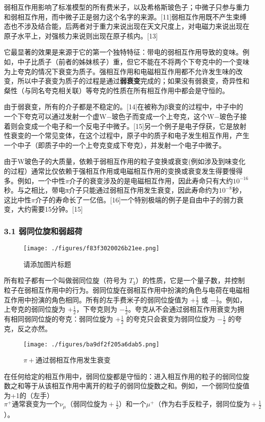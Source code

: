 弱相互作用影响了标准模型的所有费米子，以及希格斯玻色子；中微子只参与重力和弱相互作用，而中微子正是弱力这个名字的来源。[11]弱相互作用既不产生束缚态也不涉及结合能，后两者对于重力来说出现在天文尺度上，对电磁力来说出现在原子水平上，对强核力来说则出现在原子核内。[13]

它最显著的效果是来源于它的第一个独特特征：带电的弱相互作用导致的变味。例如，中子比质子（前者的姊妹核子）重，但它不能在不将两个下夸克中的一个变味为上夸克的情况下衰变为质子。强相互作用和电磁相互作用都不允许发生味的改变，所以中子衰变为质子的过程是通过\textbf{弱衰变}完成的；如果没有弱衰变，奇异性和粲性（与同名夸克相关联）等夸克的性质在所有相互作用中都会是守恒的。

由于弱衰变，所有的介子都是不稳定的。[14]在被称为β衰变的过程中，中子中的一个下夸克可以通过发射一个虚W−玻色子而变成一个上夸克，这个W−玻色子接着则会变成一个电子和一个反电子中微子。[15]另一个例子是电子俘获，它是放射性衰变的一个常见变体，在这个过程中，原子中的质子和电子发生相互作用，产生一个中子（即质子中的一个上夸克变成下夸克），并发射一个电子中微子。

由于W玻色子的大质量，依赖于弱相互作用的粒子变换或衰变(例如涉及到味变化的过程）通常比仅依赖于强相互作用或电磁相互作用的变换或衰变发生得要慢得多。例如，一个中性$\pi$介子的衰变涉及的是电磁相互作用，因此寿命只有大约$10^{-16}$秒。与之相比，带电π介子只能通过弱相互作用发生衰变，因此寿命约为$10^{-8}$秒，这比中性$\pi$介子的寿命长了一亿倍。[16]一个特别极端的例子是自由中子的弱力衰变，大约需要15分钟。[15]

\subsubsection{3.1 弱同位旋和弱超荷}
\begin{figure}[ht]
\centering
\texttt{[image: ./figures/f83f3020026b21ee.png]}
\caption{请添加图片标题} \label{fig_RXHZY_4}
\end{figure}

所有粒子都有一个叫做弱同位旋（符号为 $T_3$）的性质，它是一个量子数，并控制粒子在弱相互作用中的行为。弱同位旋在弱相互作用中扮演的角色与电荷在电磁相互作用中扮演的角色相同。所有的左手费米子的弱同位旋值为 $+\frac{1}{2}$ 或 $-\frac{1}{2}$。例如，上夸克的弱同位旋为 $+\frac{1}{2}$，下夸克则为 $-\frac{1}{2}$。夸克从不会通过弱相互作用衰变为拥有相同弱同位旋的夸克：弱同位旋为 $+\frac{1}{2}$ 的夸克只会衰变为弱同位旋为 $-\frac{1}{2}$ 的夸克，反之亦然。
\begin{figure}[ht]
\centering
\texttt{[image: ./figures/ba9df2f205a6dab5.png]}
\caption{$\pi+$通过弱相互作用发生衰变} \label{fig_RXHZY_5}
\end{figure}
在任何给定的相互作用中，弱同位旋都是守恒的：进入相互作用的粒子的弱同位旋数之和等于从该相互作用中离开的粒子的弱同位旋数之和。例如，一个弱同位旋值为+1的（左手）$\pi^+\text{通常衰变为一个}\nu_\mu\text{（弱同位旋为}+\frac{1}{2}\text{）和一个}\mu^+\text{（作为右手反粒子，弱同位旋为}+\frac{1}{2}$）。

